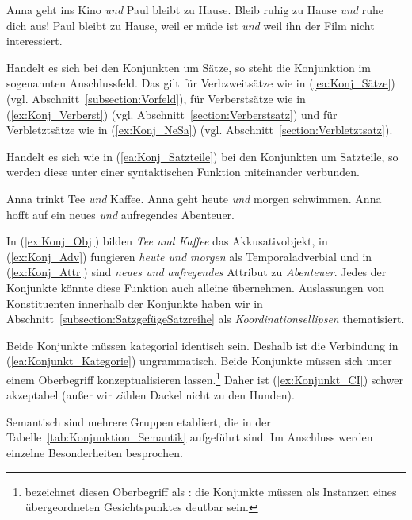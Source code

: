 \ea \label{ea:Konjunktionen}
\ea \label{ea:Konj_Sätze} Anna geht ins Kino \textit{und} Paul bleibt zu Hause.
\ex \label{ex:Konj_Verberst} Bleib ruhig zu Hause \textit{und} ruhe dich aus!
\ex \label{ex:Konj_NeSa} Paul bleibt zu Hause, weil er müde ist \textit{und} weil ihn der Film nicht interessiert.
\z 
\z 

Handelt es sich bei den Konjunkten um Sätze, so steht die Konjunktion im sogenannten Anschlussfeld. Das gilt für Verbzweitsätze wie in (\ref{ea:Konj_Sätze}) (vgl. Abschnitt~\ref{subsection:Vorfeld}), für Verberstsätze wie in (\ref{ex:Konj_Verberst}) (vgl. Abschnitt~\ref{section:Verberstsatz}) und für Verbletztsätze wie in (\ref{ex:Konj_NeSa}) (vgl. Abschnitt~\ref{section:Verbletztsatz}). 

Handelt es sich wie in (\ref{ea:Konj_Satzteile}) bei den Konjunkten um Satzteile, so werden diese unter einer syntaktischen Funktion miteinander verbunden. 

\ea \label{ea:Konj_Satzteile}
\ea \label{ex:Konj_Obj} Anna trinkt Tee \textit{und} Kaffee.
\ex \label{ex:Konj_Adv} Anna geht heute \textit{und} morgen schwimmen.
\ex \label{ex:Konj_Attr} Anna hofft auf ein neues \textit{und} aufregendes Abenteuer.
\z
\z 

In (\ref{ex:Konj_Obj}) bilden \textit{Tee und Kaffee} das Akkusativobjekt, in (\ref{ex:Konj_Adv}) fungieren \textit{heute und morgen} als Temporaladverbial und in (\ref{ex:Konj_Attr}) sind \textit{neues und aufregendes} Attribut zu \textit{Abenteuer}. Jedes der Konjunkte könnte diese Funktion auch alleine übernehmen. Auslassungen von Konstituenten innerhalb der Konjunkte haben wir in Abschnitt~\ref{subsection:SatzgefügeSatzreihe} als \textit{Koordinationsellipsen} thematisiert.

Beide Konjunkte müssen kategorial identisch sein. Deshalb ist die Verbindung in (\ref{ea:Konjunkt_Kategorie}) ungrammatisch. Beide Konjunkte müssen sich unter einem Oberbegriff konzeptualisieren lassen.\footnote{\citet[66--68]{Lang1977} bezeichnet diesen Oberbegriff als : die Konjunkte müssen als Instanzen eines übergeordneten Gesichtspunktes deutbar sein.} Daher ist (\ref{ex:Konjunkt_CI}) schwer akzeptabel (außer wir zählen Dackel nicht zu den Hunden).

\ea \label{ea:Konjunktanforderungen} 
\label{ea:Konjunkt_Kategorie} 
\label{ex:Konjunkt_CI} 
\z 
\z 

Semantisch sind mehrere Gruppen etabliert, die in der Tabelle~\ref{tab:Konjunktion_Semantik} aufgeführt sind. Im Anschluss werden einzelne Besonderheiten besprochen.

